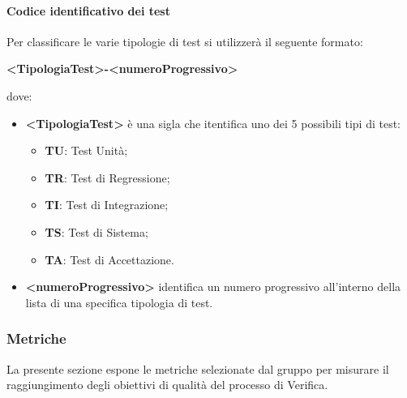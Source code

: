 				\paragraph{Codice identificativo dei test}
					Per classificare le varie tipologie di test si utilizzerà il seguente formato:
					\begin{center}
						\textbf{<TipologiaTest>-<numeroProgressivo>}
					\end{center}
					dove:
					\begin{itemize}
						\item\textbf{<TipologiaTest> } è una sigla che itentifica uno dei 5 possibili tipi di test:
							\begin{itemize}
								\item\textbf{TU}: Test Unità;
								\item\textbf{TR}: Test di Regressione;
								\item\textbf{TI}: Test di Integrazione;
								\item\textbf{TS}: Test di Sistema;
								\item\textbf{TA}: Test di Accettazione.
							\end{itemize}
						\item\textbf{<numeroProgressivo>} identifica un numero progressivo all’interno della lista di una specifica tipologia di test.
					\end{itemize}
\iftrue
		\subsubsection{Metriche}
			La presente sezione espone le metriche selezionate dal gruppo per misurare il raggiungimento degli obiettivi di qualità del processo di Verifica.
